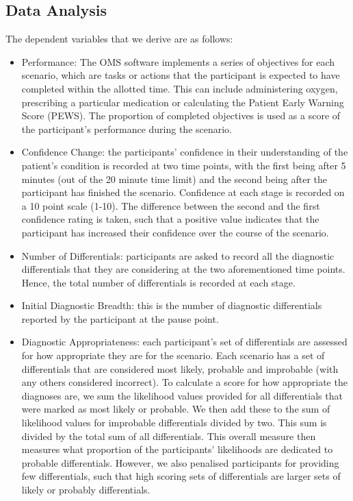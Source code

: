 \documentclass[a4paper, nobind]{templates/ociamthesis}
\providecommand{\tightlist}{%
  \setlength{\itemsep}{0pt}\setlength{\parskip}{0pt}}
\begin{document}
\hypertarget{data-analysis-2}{%
\subsection*{Data Analysis}\label{data-analysis-2}}

The dependent variables that we derive are as follows:

\begin{itemize}
\tightlist
\item
  Performance: The OMS software implements a series of objectives for each scenario, which are tasks or actions that the participant is expected to have completed within the allotted time. This can include administering oxygen, prescribing a particular medication or calculating the Patient Early Warning Score (PEWS). The proportion of completed objectives is used as a score of the participant's performance during the scenario.
\item
  Confidence Change: the participants' confidence in their understanding of the patient's condition is recorded at two time points, with the first being after 5 minutes (out of the 20 minute time limit) and the second being after the participant has finished the scenario. Confidence at each stage is recorded on a 10 point scale (1-10). The difference between the second and the first confidence rating is taken, such that a positive value indicates that the participant has increased their confidence over the course of the scenario.
\item
  Number of Differentials: participants are asked to record all the diagnostic differentials that they are considering at the two aforementioned time points. Hence, the total number of differentials is recorded at each stage.
\item
  Initial Diagnostic Breadth: this is the number of diagnostic differentials reported by the participant at the pause point.
\item
  Diagnostic Appropriateness: each participant's set of differentials are assessed for how appropriate they are for the scenario. Each scenario has a set of differentials that are considered most likely, probable and improbable (with any others considered incorrect). To calculate a score for how appropriate the diagnoses are, we sum the likelihood values provided for all differentials that were marked as most likely or probable. We then add these to the sum of likelihood values for improbable differentials divided by two. This sum is divided by the total sum of all differentials. This overall measure then measures what proportion of the participants' likelihoods are dedicated to probable differentials. However, we also penalised participants for providing few differentials, such that high scoring sets of differentials are larger sets of likely or probably differentials.
\end{itemize}
\end{document}
